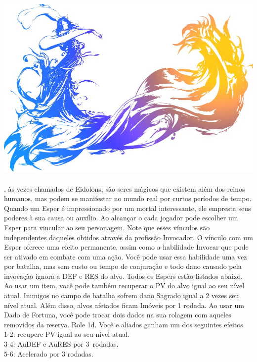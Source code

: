 %
\\\\
%
\includegraphics[width=\columnwidth]{./art/images/ff10.jpg}\\\\
%
, às vezes chamados de Eidolons, são seres mágicos que existem além dos reinos humanos, 
mas podem se manifestar no mundo real por curtos períodos de tempo.
Quando um Esper é impressionado por um mortal interessante, ele empresta seus poderes à sua causa ou auxílio.
Ao alcançar o  cada jogador pode escolher um Esper para vincular ao seu personagem. 
Note que esses vínculos são independentes daqueles obtidos através da profissão Invocador. 
O vínculo com um Esper oferece uma efeito permanente, assim como a habilidade Invocar que pode ser ativado em combate com uma ação. 
Você pode usar essa habilidade uma vez por batalha, mas sem custo ou tempo de conjuração e todo dano causado pela invocação ignora a DEF e RES do alvo. 
Todos os Espers estão listados abaixo.
%
\vfill
%
{Ao usar um item, você pode também recuperar o PV do alvo igual ao seu nível atual.}
{Inimigos no campo de batalha sofrem dano Sagrado igual a 2 vezes seu nível atual. Além disso, alvos afetados ficam Imóveis por 1 rodada.}
%
\vfill
%
{Ao usar um Dado de Fortuna, você pode trocar dois dados na sua rolagem com aqueles removidos da reserva.}
{Role 1d. Você e aliados ganham um dos seguintes efeitos. \\ 1-2: recupere PV igual ao seu nível atual. \\ 3-4: AuDEF e AuRES por 3~rodadas. \\ 5-6: Acelerado por 3 rodadas.}

